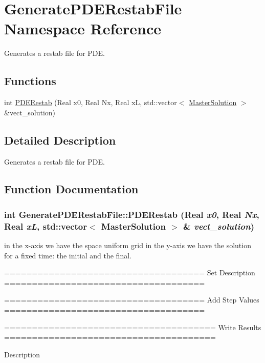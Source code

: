 \hypertarget{namespaceGeneratePDERestabFile}{
\section{GeneratePDERestabFile Namespace Reference}
\label{namespaceGeneratePDERestabFile}
}


Generates a restab file for PDE.  
\subsection*{Functions}
\begin{DoxyCompactItemize}
\item 
int \hyperlink{namespaceGeneratePDERestabFile_adb588136dbb1afef385772d90e4a40b2}{PDERestab} (Real x0, Real Nx, Real xL, std::vector$<$ \hyperlink{classMasterSolution}{MasterSolution} $>$ \&vect\_\-solution)
\end{DoxyCompactItemize}


\subsection{Detailed Description}
Generates a restab file for PDE. 

\subsection{Function Documentation}
\hypertarget{namespaceGeneratePDERestabFile_adb588136dbb1afef385772d90e4a40b2}{
\subsubsection[{PDERestab}]{\setlength{\rightskip}{0pt plus 5cm}int GeneratePDERestabFile::PDERestab (Real {\em x0}, \/  Real {\em Nx}, \/  Real {\em xL}, \/  std::vector$<$ {\bf MasterSolution} $>$ \& {\em vect\_\-solution})}}
\label{namespaceGeneratePDERestabFile_adb588136dbb1afef385772d90e4a40b2}
in the x-\/axis we have the space uniform grid in the y-\/axis we have the solution for a fixed time: the initial and the final. 

==================================== Set Description ====================================

==================================== Add Step Values ====================================

====================================== Write Results ======================================

Description 